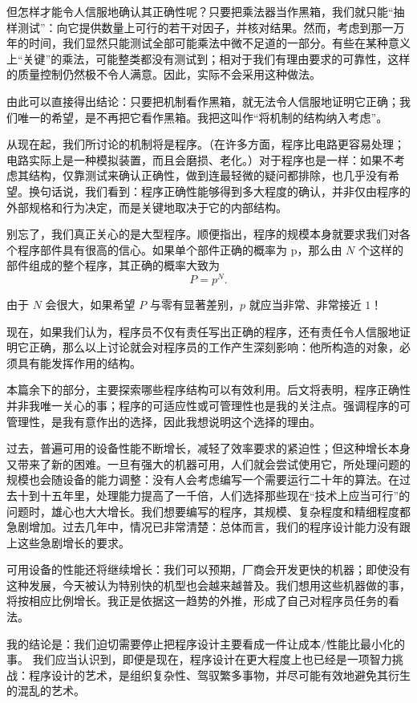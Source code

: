 \documentclass[twoside,11pt,fontset=none]{ctexbook}
\begin{document}
但怎样才能令人信服地确认其正确性呢？只要把乘法器当作黑箱，我们就只能“抽样测试”：向它提供数量上可行的若干对因子，并核对结果。然而，考虑到那一万年的时间，我们显然只能测试全部可能乘法中微不足道的一部分。有些在某种意义上“关键”的乘法，可能整类都没有测试到；相对于我们有理由要求的可靠性，这样的质量控制仍然极不令人满意。因此，实际不会采用这种做法。

由此可以直接得出结论：只要把机制看作黑箱，就无法令人信服地证明它正确；我们唯一的希望，是不再把它看作黑箱。我把这叫作“将机制的结构纳入考虑”。

从现在起，我们所讨论的机制将是程序。（在许多方面，程序比电路更容易处理；电路实际上是一种模拟装置，而且会磨损、老化。）对于程序也是一样：如果不考虑其结构，仅靠测试来确认正确性，做到连最轻微的疑问都排除，也几乎没有希望。换句话说，我们看到：程序正确性能够得到多大程度的确认，并非仅由程序的外部规格和行为决定，而是关键地取决于它的内部结构。

别忘了，我们真正关心的是大型程序。顺便指出，程序的规模本身就要求我们对各个程序部件具有很高的信心。如果单个部件正确的概率为 p，那么由 $N$ 个这样的部件组成的整个程序，其正确的概率大致为
$$
P=p^N.
$$

由于 $N$ 会很大，如果希望 $P$ 与零有显著差别，$p$ 就应当非常、非常接近 $1$！

现在，如果我们认为，程序员不仅有责任写出正确的程序，还有责任令人信服地证明它正确，那么以上讨论就会对程序员的工作产生深刻影响：他所构造的对象，必须具有能发挥作用的结构。

本篇余下的部分，主要探索哪些程序结构可以有效利用。后文将表明，程序正确性并非我唯一关心的事；程序的可适应性或可管理性也是我的关注点。强调程序的可管理性，是我有意作出的选择，因此我想说明这个选择的理由。

过去，普遍可用的设备性能不断增长，减轻了效率要求的紧迫性；但这种增长本身又带来了新的困难。一旦有强大的机器可用，人们就会尝试使用它，所处理问题的规模也会随设备的能力调整：没有人会考虑编写一个需要运行二十年的算法。在过去十到十五年里，处理能力提高了一千倍，人们选择那些现在“技术上应当可行”的问题时，雄心也大大增长。我们想要编写的程序，其规模、复杂程度和精细程度都急剧增加。过去几年中，情况已非常清楚：总体而言，我们的程序设计能力没有跟上这些急剧增长的要求。

可用设备的性能还将继续增长：我们可以预期，厂商会开发更快的机器；即使没有这种发展，今天被认为特别快的机型也会越来越普及。我们想用这些机器做的事，将按相应比例增长。我正是依据这一趋势的外推，形成了自己对程序员任务的看法。

我的结论是：我们迫切需要停止把程序设计主要看成一件让成本$/$性能比最小化的事。
我们应当认识到，即便是现在，程序设计在更大程度上也已经是一项智力挑战：程序设计的艺术，是组织复杂性、驾驭繁多事物，并尽可能有效地避免其衍生的混乱的艺术。
\end{document}
